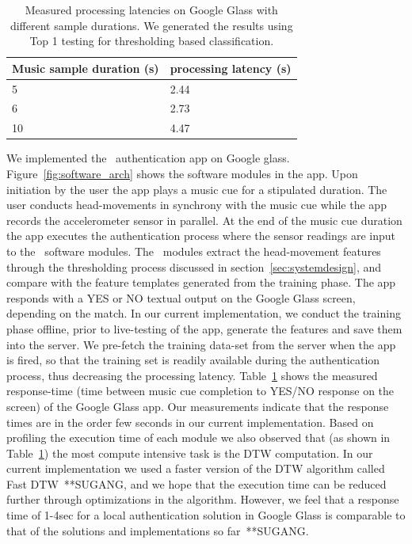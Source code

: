 \begin{table}
\small\centering
\begin{tabular}{|l|l|}\hline
Music sample duration (s) & processing latency (s) \\\hline
5 & 2.44\\\hline
6 & 2.73 \\\hline
10 & 4.47 \\\hline
\end{tabular}
\caption{Measured processing latencies on Google Glass with different sample 
durations. We generated the results using Top 1 testing for thresholding based 
classification.
\label{tab:glass}}
\end{table}

We implemented the \systemname~authentication app on Google glass. 
Figure~\ref{fig:software_arch} shows the software modules in the app.
Upon initiation by the user the app plays a music cue for a stipulated 
duration. The user conducts head-movements in synchrony with the music cue 
while the app records the accelerometer sensor in parallel. At the end of the 
music cue duration the app executes the authentication process where the 
sensor readings are input to the \systemname~software modules. The 
\systemname~modules extract the head-movement features through the 
thresholding process discussed in section~\ref{sec:systemdesign}, and compare 
with the feature templates generated from the training phase. The app responds 
with a YES or NO textual output on the Google Glass screen, depending on the 
match.
In our current implementation, we conduct the training phase offline, prior to 
live-testing of the app, generate the features and save them into the server. 
We pre-fetch the training data-set from the server when the app is fired, so 
that the training set is readily available during the authentication process, 
thus decreasing the processing latency.
Table~\ref{tab:glass} shows the measured 
response-time (time between music cue completion to YES/NO response on the 
screen) of the \systemname Google Glass app. 
Our measurements indicate that the response times are in the order few seconds 
in our current implementation. Based on profiling the execution time of each 
module we also observed that (as shown in Table~\ref{tab:glass}) the most 
compute intensive task is the DTW computation. In our current implementation 
we used a faster version of the DTW algorithm called Fast DTW~\cite{}**SUGANG, 
and 
we hope that the execution time can be reduced further through optimizations 
in the algorithm. However, we feel that a response time of 1-4sec for a local 
authentication solution in Google Glass is comparable to that of the solutions 
and implementations so far~\cite{}**SUGANG.



